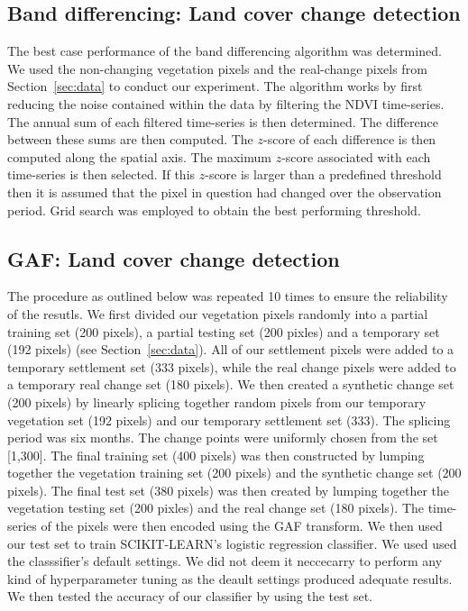 \documentclass{article}
\begin{document}
\subsection{Band differencing: Land cover change detection}
\label{sec:diff}
The best case performance of the band differencing algorithm was determined. We used the non-changing vegetation pixels and the real-change pixels from Section~\ref{sec:data} to conduct our experiment. The algorithm works by first reducing the noise contained within the data by filtering the NDVI time-series. The annual sum of each filtered time-series is then determined. The difference between these sums are then computed. The $z$-score of each difference is then computed along the spatial axis. The maximum $z$-score associated with each time-series is then selected. If this $z$-score is larger than a predefined threshold then it is assumed that the pixel in question had changed over the observation period. Grid search was employed to obtain the best performing threshold.


\subsection{GAF: Land cover change detection}
\label{sec:gaf_change}
The procedure as outlined below was repeated 10 times to ensure the reliability of the resutls. We first divided our vegetation pixels randomly into a partial training set (200 pixels), a partial testing set (200 pixles) and a temporary set (192 pixels) (see Section~\ref{sec:data}). All of our settlement pixels were added to a temporary settlement set (333 pixels), while the real change pixels were added to a temporary real change set (180 pixels). We then created a synthetic change set (200 pixels) by linearly splicing together random pixels from our temporary vegetation set (192 pixels) and our temporary settlement set (333). The splicing period was six months. The change points were uniformly chosen from the set [1,300]. The final training  set (400 pixels) was then constructed by lumping together the vegetation training set (200 pixels) and the synthetic change set (200 pixels). The final test set (380 pixels) was then created by lumping together the vegetation testing set (200 pixles) and the real change set (180 pixels). The time-series of the pixels were then encoded using the GAF transform. We then used our test set to train \textsc{SCIKIT-LEARN}'s logistic regression classifier. We used used the classsifier's default settings. We did not deem it neccecarry to perform any kind of hyperparameter tuning as the deault settings produced adequate results. We then tested the accuracy of our classifier by using the test set. 
\end{document}
